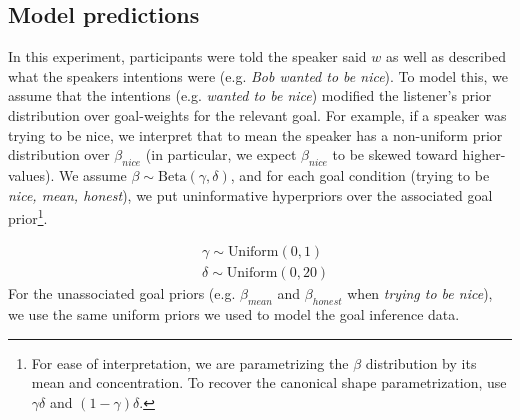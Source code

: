 \documentclass[10pt,letterpaper]{article}
\begin{document}

\subsection{Model predictions}

In this experiment, participants were told the speaker said $w$ as well as described what the speakers intentions were (e.g. \emph{Bob wanted to be nice}). 
To model this, we assume that the intentions (e.g. \emph{wanted to be nice}) modified the listener's prior distribution over goal-weights for the relevant goal. For example, if a speaker was trying to be nice, we interpret that to mean the speaker has a non-uniform prior distribution over $\beta_{nice}$ (in particular, we expect $\beta_{nice}$ to be skewed toward higher-values). 
We assume $\beta \sim \text{Beta}(\gamma, \delta)$, and for each goal condition (trying to be \emph{nice, mean, honest}), we put uninformative hyperpriors over the associated goal prior\footnote{For ease of interpretation, we are parametrizing the $\beta$ distribution by its mean and concentration. To recover the canonical shape parametrization, use $\gamma \delta$ and $(1-\gamma)\delta$.}.

%
\begin{eqnarray*}
& \gamma \sim  \text{Uniform}(0,1)\\
& \delta  \sim  \text{Uniform}(0, 20)
\end{eqnarray*}
For the unassociated goal priors (e.g. $\beta_{mean}$ and $\beta_{honest}$ when \emph{trying to be nice}), we use the same uniform priors we used to model the goal inference data.
\end{document}
